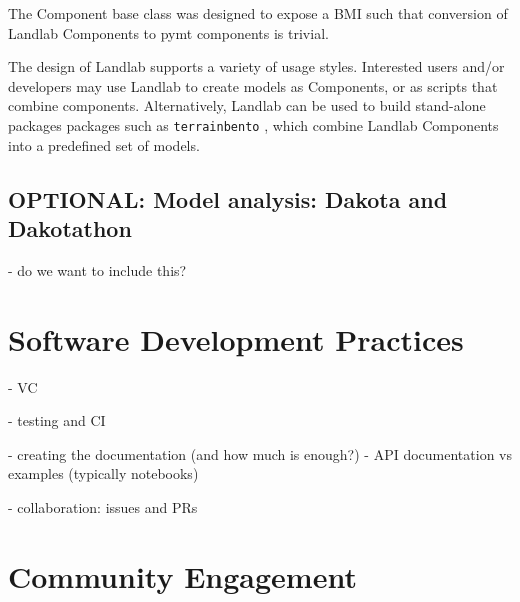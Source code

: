 \documentclass[12pt]{amsart}
\begin{document}
The Component base class was designed to expose a BMI such that conversion of Landlab Components to pymt components is trivial. 

The design of Landlab supports a variety of usage styles. Interested users and/or developers may use Landlab to create models as Components, or as scripts that combine components. Alternatively, Landlab can be used to build stand-alone packages packages such as \texttt{terrainbento} \citep{barnhart2019terrainbento}, which combine Landlab Components into a predefined set of models.





\subsection{OPTIONAL: Model analysis: Dakota and Dakotathon}

- do we want to include this?

\section{Software Development Practices}

- VC

- testing and CI

- creating the documentation (and how much is enough?)
   - API documentation vs examples (typically notebooks)

- collaboration: issues and PRs


\section{Community Engagement}
\label{sec:community}
\end{document}
